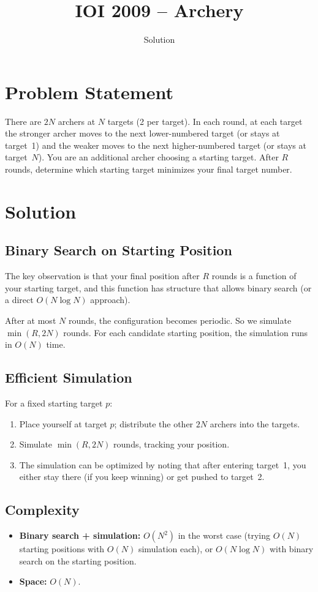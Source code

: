 \documentclass[11pt,a4paper]{article}
\title{IOI 2009 -- Archery}
\author{Solution}
\date{}
\begin{document}
\maketitle

\section{Problem Statement}
There are $2N$ archers at $N$ targets (2 per target). In each round, at each target the stronger archer moves to the next lower-numbered target (or stays at target~1) and the weaker moves to the next higher-numbered target (or stays at target~$N$). You are an additional archer choosing a starting target. After $R$ rounds, determine which starting target minimizes your final target number.

\section{Solution}

\subsection{Binary Search on Starting Position}
The key observation is that your final position after $R$ rounds is a function of your starting target, and this function has structure that allows binary search (or a direct $O(N \log N)$ approach).

After at most $N$ rounds, the configuration becomes periodic. So we simulate $\min(R, 2N)$ rounds. For each candidate starting position, the simulation runs in $O(N)$ time.

\subsection{Efficient Simulation}
For a fixed starting target $p$:
\begin{enumerate}
    \item Place yourself at target $p$; distribute the other $2N$ archers into the targets.
    \item Simulate $\min(R, 2N)$ rounds, tracking your position.
    \item The simulation can be optimized by noting that after entering target~1, you either stay there (if you keep winning) or get pushed to target~2.
\end{enumerate}

\subsection{Complexity}
\begin{itemize}
    \item \textbf{Binary search + simulation:} $O(N^2)$ in the worst case (trying $O(N)$ starting positions with $O(N)$ simulation each), or $O(N \log N)$ with binary search on the starting position.
    \item \textbf{Space:} $O(N)$.
\end{itemize}
\end{document}

